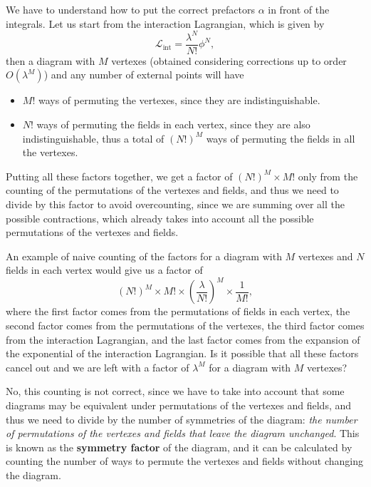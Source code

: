 We have to understand how to put the correct prefactors \(\alpha\) in front of the integrals. Let us start from the interaction Lagrangian, which is given by
\[
    \mathcal{L}_{\text{int}} = \frac{\lambda^N}{N!} \phi^N,
\]
then a diagram with \(M\) vertexes (obtained considering corrections up to order \(O(\lambda^M)\)) and any number of external points will have
\begin{itemize}
    \item \(M!\) ways of permuting the vertexes, since they are indistinguishable.
    \item \(N!\) ways of permuting the fields in each vertex, since they are also indistinguishable, thus a total of \((N!)^M\) ways of permuting the fields in all the vertexes.
\end{itemize}
Putting all these factors together, we get a factor of \((N!)^M \times M!\) only from the counting of the permutations of the vertexes and fields, and thus we need to divide by this factor to avoid overcounting, since we are summing over all the possible contractions, which already takes into account all the possible permutations of the vertexes and fields.

An example of naive counting of the factors for a diagram with \(M\) vertexes and \(N\) fields in each vertex would give us a factor of
\[
    (N!)^M \times M! \times (\frac{\lambda}{N!})^M \times \frac{1}{M!},
\]
where the first factor comes from the permutations of fields in each vertex, the second factor comes from the permutations of the vertexes, the third factor comes from the interaction Lagrangian, and the last factor comes from the expansion of the exponential of the interaction Lagrangian. Is it possible that all these factors cancel out and we are left with a factor of \(\lambda^M\) for a diagram with \(M\) vertexes?

No, this counting is not correct, since we have to take into account that some diagrams may be equivalent under permutations of the vertexes and fields, and thus we need to divide by the number of symmetries of the diagram: \textit{the number of permutations of the vertexes and fields that leave the diagram unchanged}. This is known as the \textbf{symmetry factor} of the diagram, and it can be calculated by counting the number of ways to permute the vertexes and fields without changing the diagram.

